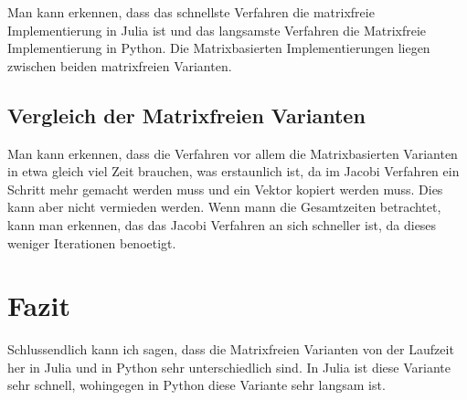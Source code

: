 \documentclass[a4paper, 11pt]{article}
\begin{document}
Man kann erkennen, dass das schnellste Verfahren die matrixfreie Implementierung in Julia ist und das langsamste Verfahren die Matrixfreie Implementierung in Python. Die Matrixbasierten Implementierungen liegen zwischen beiden matrixfreien Varianten. 

\subsection{Vergleich der Matrixfreien Varianten}
Man kann erkennen, dass die Verfahren vor allem die Matrixbasierten Varianten in etwa gleich viel Zeit brauchen, was erstaunlich ist, da im Jacobi Verfahren ein Schritt mehr gemacht werden muss und ein Vektor kopiert werden muss. 
Dies kann aber nicht vermieden werden. Wenn mann die Gesamtzeiten betrachtet, kann man erkennen, das das Jacobi Verfahren an sich schneller ist, da dieses weniger Iterationen benoetigt.

\newpage

\section{Fazit}
Schlussendlich kann ich sagen, dass die Matrixfreien Varianten von der Laufzeit her in Julia und in Python sehr unterschiedlich sind. In Julia ist diese Variante sehr schnell, wohingegen in Python diese Variante sehr langsam ist.

\end{document}
